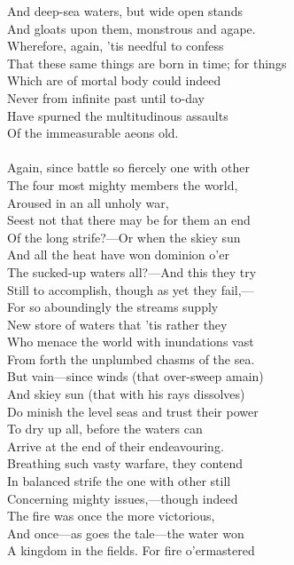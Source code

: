 And deep-sea waters, but wide open stands\\
And gloats upon them, monstrous and agape.\\
Wherefore, again, 'tis needful to confess\\
That these same things are born in time; for things\\
Which are of mortal body could indeed\\
Never from infinite past until to-day\\
Have spurned the multitudinous assaults\\
Of the immeasurable aeons old.\\
\\
Again, since battle so fiercely one with other\\
The four most mighty members the world,\\
Aroused in an all unholy war,\\
Seest not that there may be for them an end\\
Of the long strife?—Or when the skiey sun\\
And all the heat have won dominion o'er\\
The sucked-up waters all?—And this they try\\
Still to accomplish, though as yet they fail,—\\
For so aboundingly the streams supply\\
New store of waters that 'tis rather they\\
Who menace the world with inundations vast\\
From forth the unplumbed chasms of the sea.\\
But vain—since winds (that over-sweep amain)\\
And skiey sun (that with his rays dissolves)\\
Do minish the level seas and trust their power\\
To dry up all, before the waters can\\
Arrive at the end of their endeavouring.\\
Breathing such vasty warfare, they contend\\
In balanced strife the one with other still\\
Concerning mighty issues,—though indeed\\
The fire was once the more victorious,\\
And once—as goes the tale—the water won\\
A kingdom in the fields. For fire o'ermastered\\
